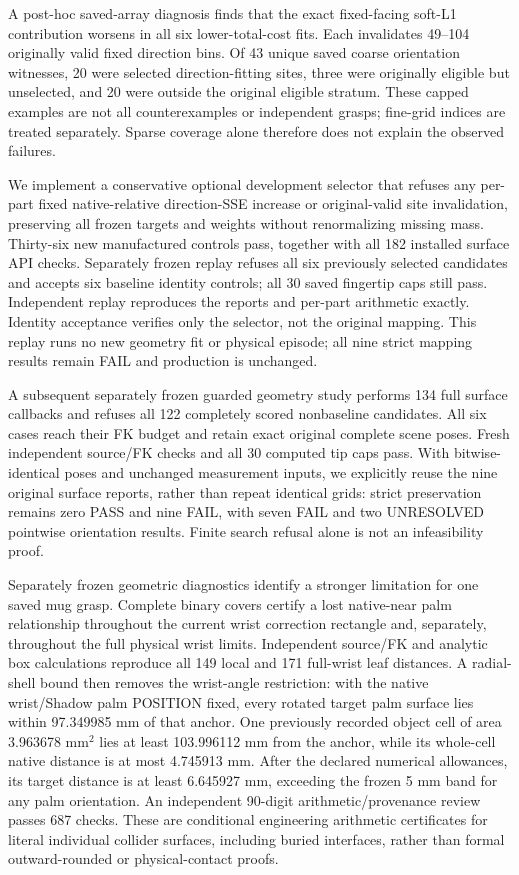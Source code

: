 \documentclass[10pt,letterpaper]{article}
\begin{document}
A post-hoc saved-array diagnosis finds that the exact fixed-facing soft-L1
contribution worsens in all six lower-total-cost fits. Each invalidates
49--104 originally valid fixed direction bins. Of 43 unique saved coarse
orientation witnesses, 20 were selected direction-fitting sites, three were
originally eligible but unselected, and 20 were outside the original eligible
stratum. These capped examples are not all counterexamples or independent
grasps; fine-grid indices are treated separately. Sparse coverage alone
therefore does not explain the observed failures.

We implement a conservative optional development selector that refuses any
per-part fixed native-relative direction-SSE increase or original-valid site
invalidation, preserving all frozen targets and weights without renormalizing
missing mass. Thirty-six new manufactured controls pass, together with all
182 installed surface API checks. Separately frozen replay refuses all six
previously selected candidates and accepts six baseline identity controls;
all 30 saved fingertip caps still pass. Independent replay reproduces the
reports and per-part arithmetic exactly. Identity acceptance verifies only
the selector, not the original mapping. This replay runs no new geometry fit or physical episode; all nine strict
mapping results remain FAIL and production is unchanged.

A subsequent separately frozen guarded geometry study performs 134 full
surface callbacks and refuses all 122 completely scored nonbaseline
candidates. All six cases reach their FK budget and retain exact original
complete scene poses. Fresh independent source/FK checks and all 30 computed
tip caps pass. With bitwise-identical poses and unchanged measurement inputs, we explicitly
reuse the nine original surface reports, rather than repeat identical grids:
strict preservation remains zero PASS and nine FAIL, with seven FAIL and two
UNRESOLVED pointwise orientation results. Finite search refusal alone is not
an infeasibility proof.

Separately frozen geometric diagnostics identify a stronger limitation for
one saved mug grasp. Complete binary covers certify a lost native-near palm
relationship throughout the current wrist correction rectangle and, separately,
throughout the full physical wrist limits. Independent source/FK and analytic
box calculations reproduce all 149 local and 171 full-wrist leaf distances.
A radial-shell bound then removes the wrist-angle restriction: with the native
wrist/Shadow palm POSITION fixed, every rotated target palm surface lies within
97.349985 mm of that anchor. One previously recorded object cell of area
3.963678 mm$^2$ lies at least 103.996112 mm from the anchor, while its whole-cell
native distance is at most 4.745913 mm. After the declared numerical allowances,
its target distance is at least 6.645927 mm, exceeding the frozen 5 mm band
for any palm orientation. An independent 90-digit arithmetic/provenance review
passes 687 checks. These are conditional engineering arithmetic certificates
for literal individual collider surfaces, including buried interfaces, rather
than formal outward-rounded or physical-contact proofs.
\end{document}
